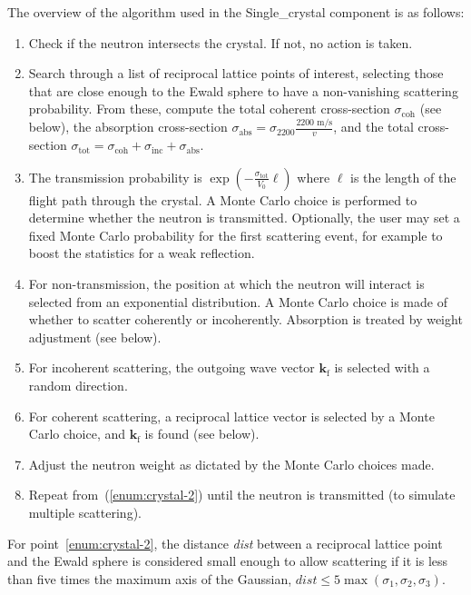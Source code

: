The overview of the algorithm used in the Single\_crystal component is
as follows:
\begin{enumerate}
\item\label{enum:crystal-1} Check if the neutron intersects the
  crystal. If not, no action is taken.
\item\label{enum:crystal-2} Search through a list of reciprocal lattice
  points of interest, selecting those that are close enough to the Ewald
  sphere to have a non-vanishing scattering probability. From these,
  compute the total coherent cross-section $\sigma_\textrm{coh}$ (see
  below), the absorption cross-section $\sigma_\textrm{abs} = \sigma_\textrm{
  2200} \frac{\textrm{2200~m/s}}{v}$, and the total cross-section
  $\sigma_\textrm{tot} = \sigma_\textrm{coh}+\sigma_\textrm{inc}+\sigma_\textrm{abs}$.
\item\label{enum:crystal-3} The transmission probability is
  $\exp(- \frac{\sigma_\textrm{tot}}{V_0}\ell)$ where $\ell$ is the length of
  the flight path through the crystal. A Monte Carlo choice is
  performed to determine
  whether the neutron is transmitted. Optionally, the user may
  set a fixed Monte Carlo probability for the first scattering event,
  for example to boost the statistics for a weak reflection.
\item\label{enum:crystal-4} For non-transmission, the position at which
  the neutron will interact is selected from an exponential
  distribution. A Monte Carlo choice is made of whether to scatter
  coherently or incoherently. Absorption is treated by weight adjustment
  (see below).
\item\label{enum:crystal-5} For incoherent scattering, the outgoing wave
  vector $\boldsymbol{k}_\textrm{f}$ is selected with a random direction.
\item\label{enum:crystal-6} For coherent scattering, a reciprocal
  lattice vector is selected by a Monte Carlo choice, and
  $\boldsymbol{k}_\textrm{f}$ is found (see below).
\item\label{enum:crystal-7} Adjust the neutron weight as dictated by the
  Monte Carlo choices made.
\item\label{enum:crystal-8} Repeat from~(\ref{enum:crystal-2}) until the
  neutron is transmitted (to simulate multiple scattering).
\end{enumerate}

For point~\ref{enum:crystal-2}, the distance
\textit{dist} between a reciprocal lattice point and the Ewald sphere is
considered small enough to allow scattering if it is less than five
times the maximum axis of the Gaussian, $\textit{dist} \leq
5\max(\sigma_1,\sigma_2,\sigma_3)$.

